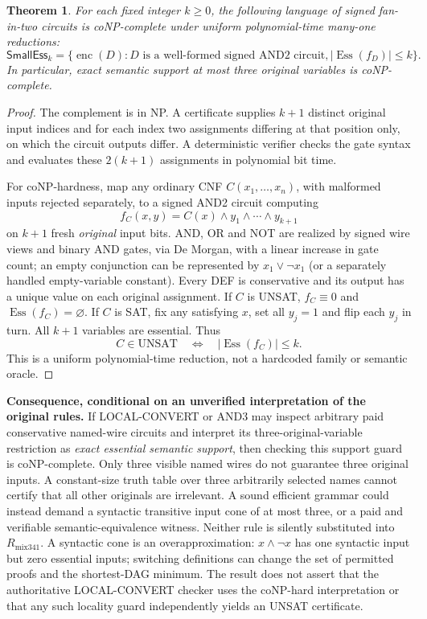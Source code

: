\documentclass[11pt]{article}
\newtheorem{theorem}{Theorem}
\begin{document}
\begin{theorem}
For each \emph{fixed} integer $k\ge0$, the following language of signed fan-in-two circuits is coNP-complete under uniform polynomial-time many-one reductions:
\[
\mathsf{SmallEss}_k=\{\operatorname{enc}(D):
 D\text{ is a well-formed signed AND2 circuit},
 |\operatorname{Ess}(f_D)|\le k\}.
\]
In particular, exact semantic support at most three original variables is coNP-complete.
\end{theorem}
\begin{proof}
The complement is in NP. A certificate supplies $k+1$ distinct original input indices and for each index two assignments differing at that position only, on which the circuit outputs differ. A deterministic verifier checks the gate syntax and evaluates these $2(k+1)$ assignments in polynomial bit time.

For coNP-hardness, map any ordinary CNF $C(x_1,\ldots,x_n)$, with malformed inputs rejected separately, to a signed AND2 circuit computing
\[
f_C(x,y)=C(x)\wedge y_1\wedge\cdots\wedge y_{k+1}
\]
on $k+1$ fresh \emph{original} input bits. AND, OR and NOT are realized by signed wire views and binary AND gates, via De Morgan, with a linear increase in gate count; an empty conjunction can be represented by $x_1\vee\neg x_1$ (or a separately handled empty-variable constant). Every DEF is conservative and its output has a unique value on each original assignment. If $C$ is UNSAT, $f_C\equiv0$ and $\operatorname{Ess}(f_C)=\varnothing$. If $C$ is SAT, fix any satisfying $x$, set all $y_j=1$ and flip each $y_j$ in turn. All $k+1$ variables are essential. Thus
\[
 C\in\mathrm{UNSAT}\quad\Longleftrightarrow\quad
 |\operatorname{Ess}(f_C)|\le k.
\]
This is a uniform polynomial-time reduction, not a hardcoded family or semantic oracle.
\end{proof}

\noindent\textbf{Consequence, conditional on an unverified interpretation of the original rules.} If LOCAL-CONVERT or AND3 may inspect arbitrary paid conservative named-wire circuits and interpret its three-original-variable restriction as \emph{exact essential semantic support}, then checking this support guard is coNP-complete. Only three visible named wires do not guarantee three original inputs. A constant-size truth table over three arbitrarily selected names cannot certify that all other originals are irrelevant. A sound efficient grammar could instead demand a syntactic transitive input cone of at most three, or a paid and verifiable semantic-equivalence witness. Neither rule is silently substituted into $R_{\mathrm{mix341}}$. A syntactic cone is an overapproximation: $x\wedge\neg x$ has one syntactic input but zero essential inputs; switching definitions can change the set of permitted proofs and the shortest-DAG minimum. The result does not assert that the authoritative LOCAL-CONVERT checker uses the coNP-hard interpretation or that any such locality guard independently yields an UNSAT certificate.
\end{document}

